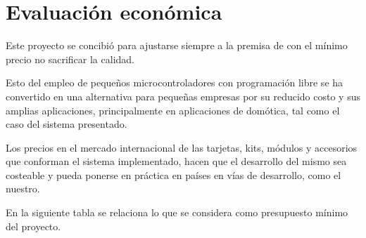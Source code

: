 \section{Evaluación económica}

Este proyecto se concibió para ajustarse siempre a la premisa de con el mínimo precio no sacrificar la calidad.

Esto del empleo de pequeños microcontroladores con programación libre se ha convertido en una alternativa para pequeñas empresas por su reducido costo y sus amplias aplicaciones, principalmente en aplicaciones de domótica, tal como el caso del sistema presentado.

Los precios en el mercado internacional de las tarjetas, kits, módulos y accesorios que conforman el sistema implementado, hacen que el desarrollo del mismo sea costeable y pueda ponerse en práctica en países en vías de desarrollo, como el nuestro.

En la siguiente tabla se relaciona lo que se considera como presupuesto mínimo del proyecto.

